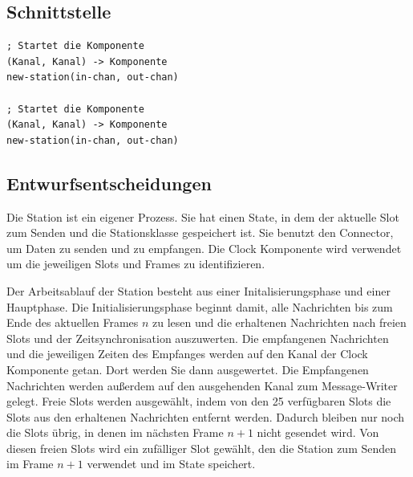 \documentclass[draft=false
              ,paper=a4
              ,twoside=false
              ,fontsize=11pt
              ,headsepline
              ,BCOR10mm
              ,DIV11
              ]{scrbook}
\begin{document}
\subsection{Schnittstelle}
\begin{lstlisting}
; Startet die Komponente
(Kanal, Kanal) -> Komponente
new-station(in-chan, out-chan)

; Startet die Komponente
(Kanal, Kanal) -> Komponente
new-station(in-chan, out-chan)
\end{lstlisting}

\subsection{Entwurfsentscheidungen}
Die Station ist ein eigener Prozess. Sie hat einen State, in dem der aktuelle Slot zum Senden und die Stationsklasse gespeichert ist. Sie benutzt den Connector, um Daten zu senden und zu empfangen. Die Clock Komponente wird verwendet um die jeweiligen Slots und Frames zu identifizieren.

Der Arbeitsablauf der Station besteht aus einer Initalisierungsphase und einer Hauptphase.
Die Initialisierungsphase beginnt damit, alle Nachrichten bis zum Ende des aktuellen Frames $n$ zu lesen und die erhaltenen Nachrichten nach freien Slots und der Zeitsynchronisation auszuwerten.
Die empfangenen Nachrichten und die jeweiligen Zeiten des Empfanges werden auf den Kanal der Clock Komponente getan. Dort werden Sie dann ausgewertet. Die Empfangenen Nachrichten werden außerdem auf den ausgehenden Kanal zum Message-Writer gelegt.
Freie Slots werden ausgewählt, indem von den 25 verfügbaren Slots die Slots aus den erhaltenen Nachrichten entfernt werden. Dadurch bleiben nur noch die Slots übrig, in denen im nächsten Frame $n + 1$ nicht gesendet wird. Von diesen freien Slots wird ein zufälliger Slot gewählt, den die Station zum Senden im Frame $n + 1$ verwendet und im State speichert.
\end{document}
